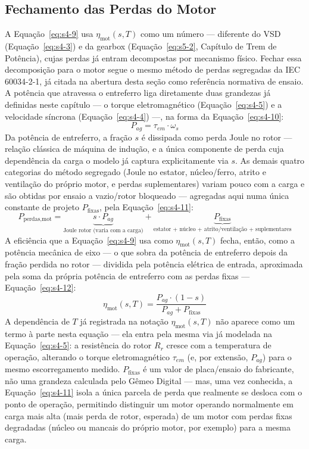 \documentclass[12pt,a4paper]{article}
\numberwithin{equation}{section}
\numberwithin{table}{section}
\numberwithin{figure}{section}
\begin{document}
	\subsection{\textbf{Fechamento das Perdas do Motor}}
	A Equação~\eqref{eq:s4-9} usa $\eta_{\text{mot}}(s,T)$ como um número — diferente do VSD (Equação~\eqref{eq:s4-3}) e da gearbox (Equação~\eqref{eq:s5-2}, Capítulo de Trem de Potência), cujas perdas já entram decompostas por mecanismo físico. Fechar essa decomposição para o motor segue o mesmo método de perdas segregadas da IEC 60034-2-1, já citada na abertura desta seção como referência normativa de ensaio. A potência que atravessa o entreferro liga diretamente duas grandezas já definidas neste capítulo — o torque eletromagnético (Equação~\eqref{eq:s4-5}) e a velocidade síncrona (Equação~\eqref{eq:s4-4}) —, na forma da Equação~\eqref{eq:s4-10}:
	\begin{equation}\label{eq:s4-10}
 P_{ag} = \tau_{em} \cdot \omega_s
\end{equation}
	Da potência de entreferro, a fração $s$ é dissipada como perda Joule no rotor — relação clássica de máquina de indução, e a única componente de perda cuja dependência da carga o modelo já captura explicitamente via $s$. As demais quatro categorias do método segregado (Joule no estator, núcleo/ferro, atrito e ventilação do próprio motor, e perdas suplementares) variam pouco com a carga e são obtidas por ensaio a vazio/rotor bloqueado — agregadas aqui numa única constante de projeto $P_{\text{fixas}}$, pela Equação~\eqref{eq:s4-11}:
	\begin{equation}\label{eq:s4-11}
 P_{\text{perdas,mot}} = \underbrace{s \cdot P_{ag}}_{\text{Joule rotor (varia com a carga)}} + \underbrace{P_{\text{fixas}}}_{\text{estator + núcleo + atrito/ventilação + suplementares}}
\end{equation}
	A eficiência que a Equação~\eqref{eq:s4-9} usa como $\eta_{\text{mot}}(s,T)$ fecha, então, como a potência mecânica de eixo — o que sobra da potência de entreferro depois da fração perdida no rotor — dividida pela potência elétrica de entrada, aproximada pela soma da própria potência de entreferro com as perdas fixas — Equação~\eqref{eq:s4-12}:
	\begin{equation}\label{eq:s4-12}
 \eta_{\text{mot}}(s,T) = \frac{P_{ag} \cdot (1-s)}{P_{ag} + P_{\text{fixas}}}
\end{equation}
	A dependência de $T$ já registrada na notação $\eta_{\text{mot}}(s,T)$ não aparece como um termo à parte nesta equação — ela entra pela mesma via já modelada na Equação~\eqref{eq:s4-5}: a resistência do rotor $R_r$ cresce com a temperatura de operação, alterando o torque eletromagnético $\tau_{em}$ (e, por extensão, $P_{ag}$) para o mesmo escorregamento medido. $P_{\text{fixas}}$ é um valor de placa/ensaio do fabricante, não uma grandeza calculada pelo Gêmeo Digital — mas, uma vez conhecida, a Equação~\eqref{eq:s4-11} isola a única parcela de perda que realmente se desloca com o ponto de operação, permitindo distinguir um motor operando normalmente em carga mais alta (mais perda de rotor, esperada) de um motor com perdas fixas degradadas (núcleo ou mancais do próprio motor, por exemplo) para a mesma carga.
\end{document}
